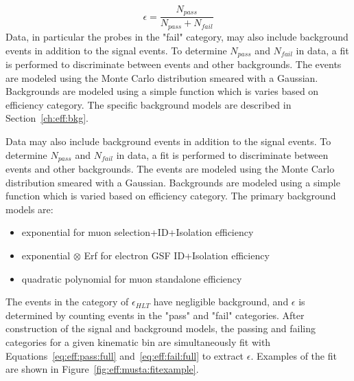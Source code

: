 \begin{equation}
\epsilon = \frac{N_{pass}}{N_{pass}+N_{fail}}
\label{eq:eff:eq}
\end{equation}
Data, in particular the probes in the "fail" category, may also include background events in addition to the \zll signal events. To determine $N_{pass}$ and $N_{fail}$ in data, a fit is performed to discriminate between \zll events and other backgrounds. The \zll events are modeled using the Monte Carlo distribution smeared with a Gaussian. Backgrounds are modeled using a simple function which is varies based on efficiency category. The specific background models are described in Section~\ref{ch:eff:bkg}.


Data may also include background events in addition to the \zll signal events. To determine $N_{pass}$ and $N_{fail}$ in data, a fit is performed to discriminate between \zll events and other backgrounds. The \zll events are modeled using the Monte Carlo distribution smeared with a Gaussian. Backgrounds are modeled using a simple function which is varied based on efficiency category. The primary background models are:



\begin{itemize}
\item exponential for muon selection+ID+Isolation efficiency
\item exponential $\otimes$ Erf for electron GSF ID+Isolation efficiency
\item quadratic polynomial for muon standalone efficiency
\end{itemize}

The events in the category of $\epsilon_{HLT}$ have negligible background, and $\epsilon$ is determined by counting events in the "pass" and "fail" categories.
After construction of the signal and background models, the passing and failing categories for a given kinematic bin are simultaneously fit with Equations~\ref{eq:eff:pass:full} and~\ref{eq:eff:fail:full} to extract $\epsilon$. Examples of the fit are shown in Figure~\ref{fig:eff:musta:fitexample}.

